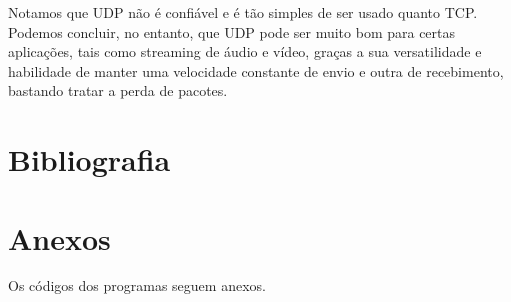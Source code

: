 \documentclass[12pt,a4paper]{article}
\begin{document}
Notamos que UDP não é confiável e é tão simples de ser usado
quanto TCP. Podemos concluir, no entanto, que UDP pode ser muito
bom para certas aplicações, tais como streaming de áudio e vídeo,
graças a sua versatilidade e habilidade de manter uma velocidade
constante de envio e outra de recebimento, bastando tratar a perda
de pacotes. 

\section{Bibliografia}
\nocite{beej}




\section{Anexos}

Os códigos dos programas seguem anexos.
\end{document}
